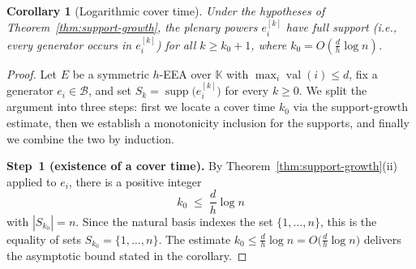 \documentclass[12pt,a4paper]{amsart}
\newtheorem{corollary}[theorem]{Corollary}
\theoremstyle{definition}
\DeclareMathOperator{\val}{val}
\DeclareMathOperator{\supp}{supp}
\newcommand{\K}{\mathbb{K}}
\newcommand{\EA}{E}          %
\newcommand{\natbasis}{\mathcal{B}}  %
\begin{document}
\begin{corollary}[Logarithmic cover time]
\label{cor:cover-time}
Under the hypotheses of Theorem~\ref{thm:support-growth}, the plenary
powers $e_i^{[k]}$ have full support (i.e., every generator occurs in
$e_i^{[k]}$) for all $k\ge k_0+1$, where $k_0=O(\frac{d}{h}\log n)$.
\end{corollary}

\begin{proof}
Let $\EA$ be a symmetric $h$-EEA over $\K$ with $\max_i\val(i)\le d$,
fix a generator $e_i\in\natbasis$, and set $S_k=\supp\bigl(e_i^{[k]}\bigr)$
for every $k\ge 0$.  We split the argument into three steps: first we
locate a cover time $k_0$ via the support-growth estimate, then we
establish a monotonicity inclusion for the supports, and finally we
combine the two by induction.

\medskip
\noindent\textbf{Step~1 (existence of a cover time).}
By Theorem~\ref{thm:support-growth}(ii) applied to $e_i$, there is a
positive integer
\[
  k_0\;\le\;\frac{d}{h}\log n
\]
with $|S_{k_0}|=n$.  Since the natural basis indexes the set
$\{1,\ldots,n\}$, this is the equality of sets
$S_{k_0}=\{1,\ldots,n\}$.  The estimate $k_0\le\frac{d}{h}\log n=
O\!\bigl(\frac{d}{h}\log n\bigr)$ delivers the asymptotic bound stated
in the corollary.


\end{proof}
\end{document}
